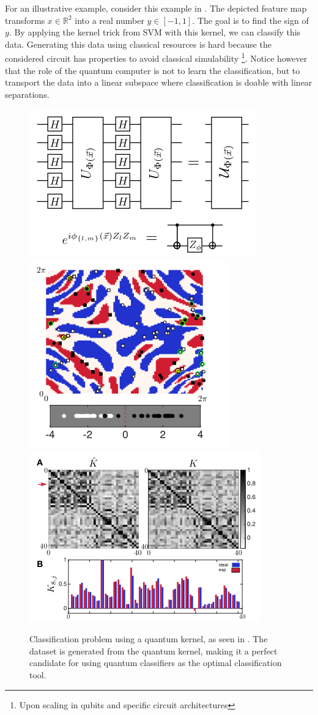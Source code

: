 \documentclass[]{report}
\begin{document}
For an illustrative example, consider this example in  \cite{havlicek2019supervised}. The depicted feature map transforms $x \in \mathbb R^2$ into a real number $y \in [-1, 1]$. The goal is to find the sign of $y$. By applying the kernel trick from SVM with this kernel, we can classify this data. 
Generating this data using classical resources is hard because the considered circuit has properties to avoid classical simulability \footnote{Upon scaling in qubits and specific circuit architectures}. Notice however that the role of the quantum computer is not to learn the classification, but to transport the data into a linear subspace where classification is doable with linear separations. 

\begin{figure}
\centering
\includegraphics[height = .3\linewidth]{images/havlicek-kernel1}
\includegraphics[height = .3\linewidth]{images/havlicek_data}
\includegraphics[width = .6\linewidth]{images/havlicek-kernel2}
\caption{Classification problem using a quantum kernel, as seen in \cite{havlicek2019supervised}. The dataset is generated from the quantum kernel, making it a perfect candidate for using quantum classifiers as the optimal classification tool. }
\label{fig.havlicek-kernel}
\end{figure}
\end{document}
